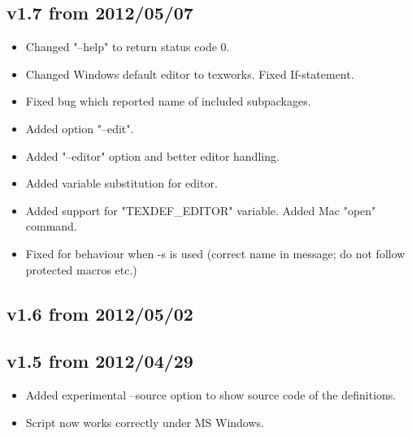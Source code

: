 \documentclass{ydoc}
\begin{document}
\subsection*{v1.7 from 2012/05/07}
\begin{itemize}
 \item Changed "--help" to return status code 0.
 \item Changed Windows default editor to texworks. Fixed If-statement.
 \item Fixed bug which reported name of included subpackages.
 \item Added option "--edit".
 \item Added "--editor" option and better editor handling.
 \item Added variable substitution for editor.
 \item Added support for "TEXDEF_EDITOR" variable. Added Mac "open" command.
 \item Fixed for behaviour when -s is used (correct name in message; do not follow protected macros etc.)
\end{itemize}

\subsection*{v1.6 from 2012/05/02}

\subsection*{v1.5 from 2012/04/29}
\begin{itemize}
 \item Added experimental --source option to show source code of the definitions.
 \item Script now works correctly under MS Windows.
\end{itemize}
\end{document}
